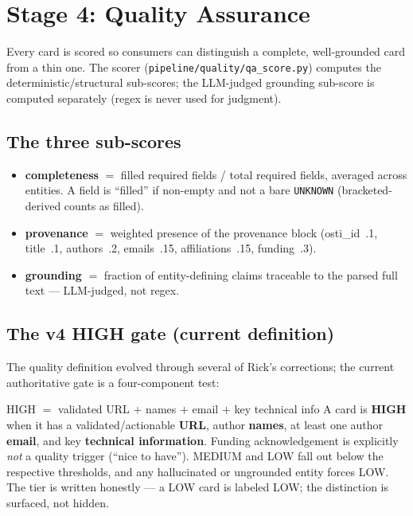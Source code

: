\documentclass[11pt,letterpaper]{article}
\newcommand{\code}[1]{\texttt{\small #1}}
\begin{document}
\clearpage
\section{Stage 4: Quality Assurance}

Every card is scored so consumers can distinguish a complete, well-grounded card
from a thin one. The scorer (\code{pipeline/quality/qa\_score.py}) computes the
deterministic/structural sub-scores; the LLM-judged grounding sub-score is computed
separately (regex is never used for judgment).

\subsection{The three sub-scores}

\begin{itemize}[noitemsep,topsep=3pt]
\item \textbf{completeness} $=$ filled required fields / total required fields,
  averaged across entities. A field is ``filled'' if non-empty and not a bare
  \code{UNKNOWN} (bracketed-derived counts as filled).
\item \textbf{provenance} $=$ weighted presence of the provenance block
  (osti\_id~.1, title~.1, authors~.2, emails~.15, affiliations~.15, funding~.3).
\item \textbf{grounding} $=$ fraction of entity-defining claims traceable to the
  parsed full text --- LLM-judged, not regex.
\end{itemize}

\subsection{The v4 HIGH gate (current definition)}

The quality definition evolved through several of Rick's corrections; the current
authoritative gate is a four-component test:

\begin{rulebox}{HIGH $=$ validated URL $+$ names $+$ email $+$ key technical info}
A card is \textbf{HIGH} when it has a validated/actionable \textbf{URL}, author
\textbf{names}, at least one author \textbf{email}, and key \textbf{technical
information}. Funding acknowledgement is explicitly \emph{not} a quality trigger
(``nice to have''). MEDIUM and LOW fall out below the respective thresholds, and any
hallucinated or ungrounded entity forces LOW. The tier is written honestly --- a LOW
card is labeled LOW; the distinction is surfaced, not hidden.
\end{rulebox}
\end{document}
